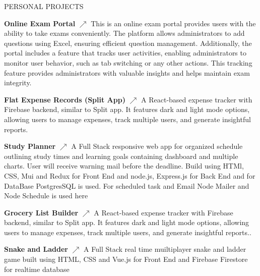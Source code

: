 \documentclass{resume} %
\begin{document}
\begin{rSection}{PERSONAL PROJECTS}
\item \textbf{Online Exam Portal}
\href{https://react-online-exam-portal.vercel.app/}{\texorpdfstring{\(\nearrow\)}{nearrow}}
{
This is an online exam portal provides users with the ability to take exams conveniently. The platform allows administrators to add questions using Excel, ensuring efficient question management. Additionally, the portal includes a feature that tracks user activities, enabling administrators to monitor user behavior, such as tab switching or any other actions. This tracking feature provides administrators with valuable insights and helps maintain exam integrity.}




            
\item \textbf{Flat Expense Records (Split App)}
\href{https://github.com/Kash15if/react-flat-expense-record}{\texorpdfstring{\(\nearrow\)}{nearrow}}
{A React-based expense tracker with Firebase backend, similar to Split app. It features dark and light mode options, allowing users to manage expenses, track multiple users, and generate insightful reports.}



\item \textbf{Study Planner} 
\href{https://study-planner-phi.vercel.app/dashboard}{\texorpdfstring{\(\nearrow\)}{nearrow}}
{A Full Stack responsive web app for organized schedule outlining study times and learning goals containing dashboard and multiple charts. User will receive warning mail before the deadline. Build using HTMl, CSS, Mui and Redux for Front End and node.js, Express.js for Back End and for DataBase PostgresSQL is used. For scheduled task and Email Node Mailer and Node Schedule is used here}


\item {\bf Grocery List Builder}
\href{https://react-grocery-list-firebase.vercel.app/}{\texorpdfstring{\(\nearrow\)}{nearrow}}  {A React-based expense tracker with Firebase backend, similar to Split app. It features dark and light mode options, allowing users to manage expenses, track multiple users, and generate insightful reports..}


\item {\bf Snake and Ladder}
\href{https://vue-snake-ladder.vercel.app/}{\texorpdfstring{\(\nearrow\)}{nearrow}}
{A Full Stack real time muiltiplayer snake and ladder game built using HTML, CSS and Vue.js for Front End and Firebase Firestore for realtime database}


\end{rSection}
\end{document}
